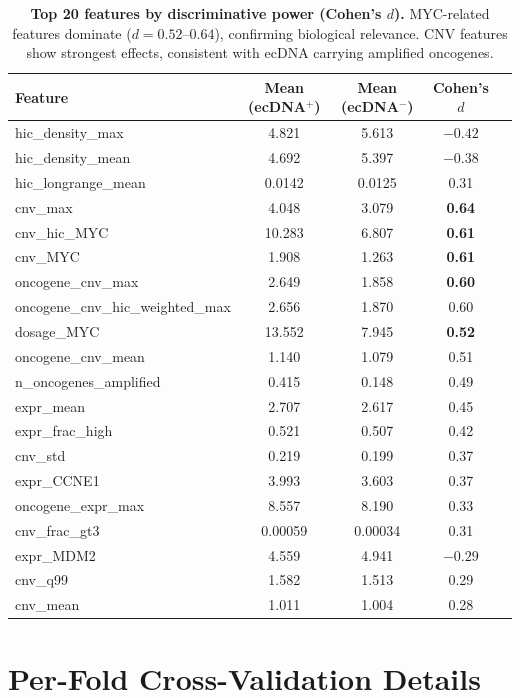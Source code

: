 \documentclass{article}
\begin{document}
\begin{table}[h]
\caption{\textbf{Top 20 features by discriminative power (Cohen's $d$).} MYC-related features dominate ($d = 0.52$--$0.64$), confirming biological relevance. CNV features show strongest effects, consistent with ecDNA carrying amplified oncogenes.}
\label{tab:feature_effects}
\centering
\small
\begin{tabular}{@{}lcccc@{}}
\toprule
Feature & Mean (ecDNA$^+$) & Mean (ecDNA$^-$) & Cohen's $d$ \\
\midrule
hic\_density\_max & 4.821 & 5.613 & $-0.42$ \\
hic\_density\_mean & 4.692 & 5.397 & $-0.38$ \\
hic\_longrange\_mean & 0.0142 & 0.0125 & 0.31 \\
cnv\_max & 4.048 & 3.079 & \textbf{0.64} \\
cnv\_hic\_MYC & 10.283 & 6.807 & \textbf{0.61} \\
cnv\_MYC & 1.908 & 1.263 & \textbf{0.61} \\
oncogene\_cnv\_max & 2.649 & 1.858 & \textbf{0.60} \\
oncogene\_cnv\_hic\_weighted\_max & 2.656 & 1.870 & 0.60 \\
dosage\_MYC & 13.552 & 7.945 & \textbf{0.52} \\
oncogene\_cnv\_mean & 1.140 & 1.079 & 0.51 \\
n\_oncogenes\_amplified & 0.415 & 0.148 & 0.49 \\
expr\_mean & 2.707 & 2.617 & 0.45 \\
expr\_frac\_high & 0.521 & 0.507 & 0.42 \\
cnv\_std & 0.219 & 0.199 & 0.37 \\
expr\_CCNE1 & 3.993 & 3.603 & 0.37 \\
oncogene\_expr\_max & 8.557 & 8.190 & 0.33 \\
cnv\_frac\_gt3 & 0.00059 & 0.00034 & 0.31 \\
expr\_MDM2 & 4.559 & 4.941 & $-0.29$ \\
cnv\_q99 & 1.582 & 1.513 & 0.29 \\
cnv\_mean & 1.011 & 1.004 & 0.28 \\
\bottomrule
\end{tabular}
\end{table}


\section{Per-Fold Cross-Validation Details}
\label{app:perfold}
\end{document}
